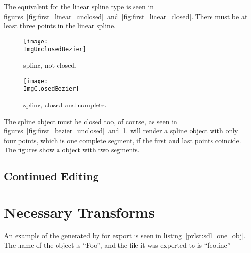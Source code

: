 		The equivalent for the linear spline type is seen in
		figures~\ref{fig:first_linear_unclosed}~and~\ref{fig:first_linear_closed}.
		There must be at least three points in the linear spline.		

		\begin{figure}[htbp]
		\centering
		\texttt{[image: \\ImgUnclosedBezier]}
		\caption{\dtybezieru{} spline, not closed.}
		\label{fig:first_bezier_unclosed}
		\vspace{16pt}
		\texttt{[image: \\ImgClosedBezier]}
		\caption{\dtybezieru{} spline, closed and complete.}
		\label{fig:first_bezier_closed}
		\end{figure}

		The \dtybezierl{} spline object must be closed too, of course,
		as seen in
		figures~\ref{fig:first_bezier_unclosed}~and~\ref{fig:first_bezier_closed}.
		\IXpov{} will render a \dtybezierl{} spline object with only
		four points, which is one complete segment, if the first
		and last points coincide.
		The figures show a \dtybezierl{} object
		with two segments.


		\subsection{Continued Editing}%


	\section{Necessary Transforms}%
	An example of the  generated by \IXpkg{}
	for export is seen in listing~\ref{pvlst:sdl_one_obj}.
	The name of the object is ``Foo'', and the file it was
	exported to is ``foo.inc''
	
